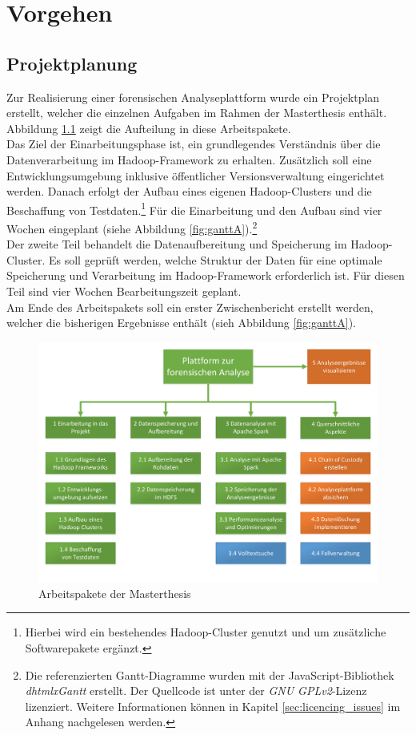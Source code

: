 \chapter{Vorgehen}
\label{ch:development_approach}

\section{Projektplanung}
\label{sec:project_plan}
Zur Realisierung einer forensischen Analyseplattform wurde ein Projektplan erstellt, welcher die einzelnen Aufgaben im Rahmen der Masterthesis enthält. Abbildung \ref{fig:workpackages} zeigt die Aufteilung in diese Arbeitspakete.\\
Das Ziel der Einarbeitungsphase ist, ein grundlegendes Verständnis über die Datenverarbeitung im Hadoop-Framework zu erhalten. Zusätzlich soll eine Entwicklungsumgebung inklusive öffentlicher Versionsverwaltung eingerichtet werden. Danach erfolgt der Aufbau eines eigenen Hadoop-Clusters und die Beschaffung von Testdaten.\footnote{Hierbei wird ein bestehendes Hadoop-Cluster genutzt und um zusätzliche Softwarepakete ergänzt.} Für die Einarbeitung und den Aufbau sind vier Wochen eingeplant (siehe Abbildung \ref{fig:ganttA}).\footnote{Die referenzierten Gantt-Diagramme wurden mit der JavaScript-Bibliothek \textit{dhtmlxGantt} erstellt. Der Quellcode ist unter der \textit{GNU GPLv2}-Lizenz lizenziert. Weitere Informationen können in Kapitel \ref{sec:licencing_issues} im Anhang nachgelesen werden.}\\

\noindent
Der zweite Teil behandelt die Datenaufbereitung und Speicherung im Hadoop-Cluster. Es soll geprüft werden, welche Struktur der Daten für eine optimale Speicherung und Verarbeitung im Hadoop-Framework erforderlich ist. Für diesen Teil sind vier Wochen Bearbeitungszeit geplant.\\
Am Ende des Arbeitspakets soll ein erster Zwischenbericht erstellt werden, welcher die bisherigen Ergebnisse enthält (sieh Abbildung \ref{fig:ganttA}).\\

\begin{figure}[ht]
  \centering
  \includegraphics[width=\textwidth]{./resource/Arbeitspakete.pdf}
  \caption{Arbeitspakete der Masterthesis}
  \label{fig:workpackages}
\end{figure}

